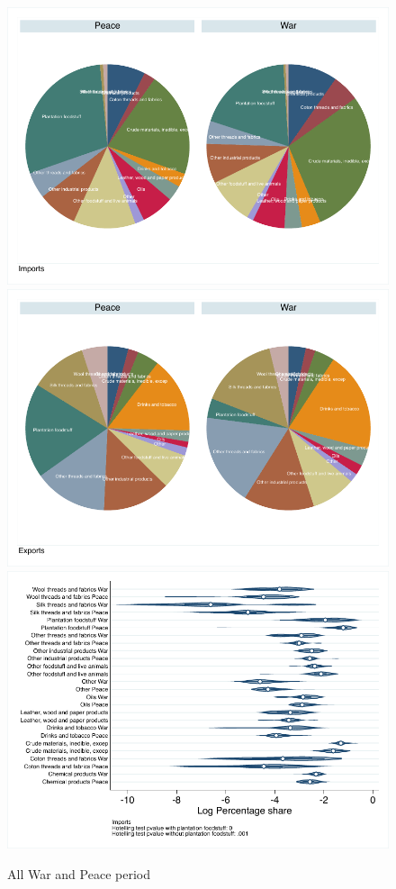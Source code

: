\documentclass[12pt,a4paper,notitlepage,english]{article}
\begin{document}
\begin{figure}
\centering
\caption{All War and Peace period}
\label{peace_war_composition}
\includegraphics[scale=.63]{peace_war_composition_I}
\includegraphics[scale=.63]{peace_war_composition_X}
\vspace{0.7cm}
\includegraphics[scale=.63]{peace_war_distribution_I}

\end{figure}
\end{document}
